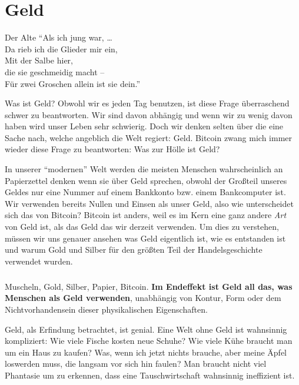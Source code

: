 \chapter{Geld}
\label{les:11}

\begin{chapquote}{Der Alte}
\enquote{Als ich jung war, \ldots \\
Da rieb ich die Glieder mir ein, \\
Mit der Salbe hier, \\
die sie geschmeidig macht -- \\
Für zwei Groschen allein ist sie dein.}
\end{chapquote}

Was ist Geld? Obwohl wir es jeden Tag benutzen, ist diese Frage überraschend
schwer zu beantworten. Wir sind davon abhängig und wenn wir zu wenig davon haben
wird unser Leben sehr schwierig. Doch wir denken selten über die eine Sache
nach, welche angeblich die Welt regiert: Geld. Bitcoin zwang mich immer wieder
diese Frage zu beantworten: Was zur Hölle ist Geld?

In unserer \enquote{modernen} Welt werden die meisten Menschen wahrscheinlich an
Papierzettel denken wenn sie über Geld sprechen, obwohl der Großteil unseres
Geldes nur eine Nummer auf einem Bankkonto bzw. einem Bankcomputer ist. Wir
verwenden bereits Nullen und Einsen als unser Geld, also wie unterscheidet sich
das von Bitcoin? Bitcoin ist anders, weil es im Kern eine ganz andere
\textit{Art} von Geld ist, als das Geld das wir derzeit verwenden. Um dies zu
verstehen, müssen wir uns genauer ansehen was Geld eigentlich ist, wie es
entstanden ist und warum Gold und Silber für den größten Teil der
Handelsgeschichte verwendet wurden.

\paragraph{}
Muscheln, Gold, Silber, Papier, Bitcoin. \textbf{Im Endeffekt ist Geld all das,
was Menschen als Geld verwenden}, unabhängig von Kontur, Form
oder dem Nichtvorhandensein dieser physikalischen Eigenschaften.

Geld, als Erfindung betrachtet, ist genial. Eine Welt ohne Geld ist wahnsinnig
kompliziert: Wie viele Fische kosten neue Schuhe? Wie viele Kühe braucht man um
ein Haus zu kaufen? Was, wenn ich jetzt nichts brauche, aber meine Äpfel
loswerden muss, die langsam vor sich hin faulen? Man braucht nicht viel Phantasie
um zu erkennen, dass eine Tauschwirtschaft wahnsinnig ineffizient ist.

